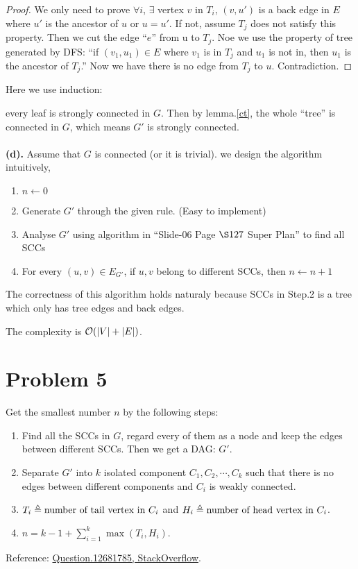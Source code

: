 \documentclass{article}
\begin{document}
\begin{proof}
	We only need to prove $\forall i$, $\exists$ vertex $v$ in $T_i$, $(v,u')$ is a back edge in $E$ where $u'$ is the ancestor of $u$ or  $u=u'$.
	If not, assume $T_j$ does not satisfy this property. Then we cut the edge ``$e$'' from u to $T_j$.
	Noe we use the property of tree generated by DFS: ``if $(v_1,u_1)\in E$ where $v_1$ is in $T_j$ and $u_1$ is not in, then $u_1$ is the ancestor of $T_j$.''
	Now we have there is no edge from $T_j$ to $u$. Contradiction.
\end{proof}
Here we use induction:

every leaf is strongly connected in $G$. Then by lemma.\ref{ct}, the whole ``tree'' is connected in $G$, which means $G'$ is strongly connected.
\\\\
\textbf{(d).}
Assume that $G$ is connected (or it is trivial).
we design the algorithm intuitively,
\begin{enumerate}
	\item $n\gets 0$
	\item Generate $G'$ through the given rule. (Easy to implement)
	\item Analyse $G'$ using algorithm in ``Slide-06 Page $\S127$ Super Plan'' to find all SCCs 
	\item For every $(u,v)\in E_{G'}$, if $u,v$ belong to different SCCs, then $n\gets n+1$
\end{enumerate}
The correctness of this algorithm holds naturaly because SCCs in Step.2 is a tree which only has tree edges and back edges.

The complexity is $\mathcal{O}(\qty|V|+\qty|E|)$.

\section*{Problem 5}
Get the smallest number $n$ by the following steps:
\begin{enumerate}
	\item Find all the SCCs in $G$, regard every of them as a node and keep the edges between different SCCs. Then we get a DAG: $G'$. 
	\item Separate $G'$ into $k$ isolated component $C_1,C_2,\cdots,C_k$ such that there is no edges between different components and $C_i$ is weakly connected.
	\item $T_i\triangleq\text{number of tail vertex in }C_i$ and $H_i\triangleq\text{number of head vertex in }C_i$.
	\item $n=k-1+\sum_{i=1}^k\max(T_i,H_i)$.
\end{enumerate}
Reference: \href{https://stackoverflow.com/questions/12681785}{Question.12681785, StackOverflow}.
\end{document}
